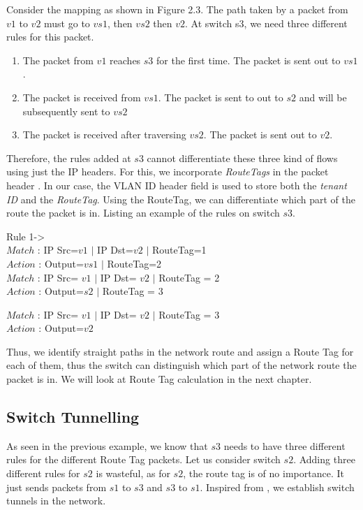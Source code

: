 Consider the mapping as shown in Figure 2.3. The path taken by a packet from $v1$ to $v2$ must go to $vs1$, then $vs2$ then $v2$. At switch s3, we need three different rules for this packet. 
\begin{enumerate}
	\item The packet from $v1$ reaches $s3$ for the first time. The packet is sent out to $vs1$. 
	\item The packet is received from $vs1$. The packet is sent to out to $s2$ and will be subsequently sent to $vs2$
	\item The packet is received after traversing $vs2$. The packet is sent out to $v2$.
\end{enumerate}
Therefore, the rules added at $s3$ cannot differentiate these three kind of flows using just the IP headers. For this, we incorporate \emph{RouteTags} in the packet header \cite{simple}. In our case, the VLAN ID header field is used to store both the \emph{tenant ID} and the \emph{RouteTag}. Using the RouteTag, we can differentiate which part of the route the packet is in. Listing an example of the rules on switch $s3$. 
\begin{center}
	Rule 1-> \\
	$Match$ : IP Src=$v1$ $|$ IP Dst=$v2$ $|$ RouteTag=1 \\
	$Action$ : Output=$vs1$ $|$ RouteTag=2 \\
	
	$Match$ : IP Src= $v1$ $|$ IP Dst= $v2$ $|$ RouteTag = 2 \\
	$Action$ : Output=$s2$ $|$ RouteTag = 3
	
	$Match$ : IP Src= $v1$ $|$ IP Dst= $v2$ $|$ RouteTag = 3 \\
	$Action$ : Output=$v2$ 
\end{center}
Thus, we identify straight paths in the network route and assign a Route Tag for each of them, thus the switch can distinguish which
part of the network route the packet is in. We will look at Route Tag calculation in the next chapter.

\subsection {Switch Tunnelling} 
As seen in the previous example, we know that $s3$ needs to have three different rules for the different Route Tag 
packets. Let us consider switch $s2$. Adding three different rules for $s2$ is wasteful, as for $s2$, the route tag is 
of no importance. It just sends packets from $s1$ to $s3$ and $s3$ to $s1$. Inspired from \cite{simple}, we establish
switch tunnels in the network. 







 

